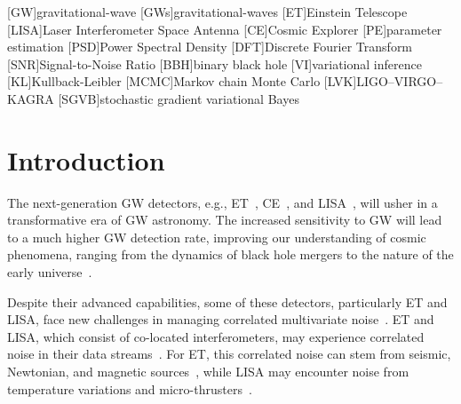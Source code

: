 \documentclass[%
 reprint,
 amsmath,amssymb,
 aps,
 nofootinbib,
]{revtex4-2}
\begin{document}
\maketitle


\begin{acronym}
    [GW]{gravitational-wave}
    [GWs]{gravitational-waves}
    [ET]{Einstein Telescope}
    [LISA]{Laser Interferometer Space Antenna}
    [CE]{Cosmic Explorer}
    [PE]{parameter estimation}
    [PSD]{Power Spectral Density}
    [DFT]{Discrete Fourier Transform}
    [SNR]{Signal-to-Noise Ratio}
    [BBH]{binary black hole}
    [VI]{variational inference}
    [KL]{Kullback-Leibler}
    [MCMC]{Markov chain Monte Carlo}
    [LVK]{LIGO--VIRGO--KAGRA}
    [SGVB]{stochastic gradient variational Bayes}
\end{acronym}


\section{Introduction}

The next-generation \ac{GW} detectors, e.g., \ac{ET}~\cite{Punturo_2010}, \ac{CE}~\cite{CE_horizon_study}, and \ac{LISA}~\cite{LISA_science_case}, will usher in a transformative era of \ac{GW} astronomy. 
The increased sensitivity to \ac{GW} will lead to a much higher \ac{GW} detection rate, improving our understanding of cosmic phenomena, ranging from the dynamics of black hole mergers to the nature of the early universe~\cite{ET_science_case, Maggiore_2020_ET_science_case, Branchesi_2023_ET_science_case, CE_horizon_study, LISA_science_case}.

Despite their advanced capabilities, some of these detectors, particularly \ac{ET} and \ac{LISA}, face new challenges in managing correlated multivariate noise~\cite{ET_design_report,LISA_red_book}.
\ac{ET} and \ac{LISA}, which consist of co-located interferometers, may experience correlated noise in their data streams~\cite{Janssens2023}. 
For \ac{ET}, this correlated noise can stem from seismic, Newtonian, and magnetic sources~\cite{Ball_lightning_strokes, Janssens_newtonian_seismic, Janssens_magnetic_noise}, while \ac{LISA}  may encounter noise from temperature variations and micro-thrusters~\cite{lisa_temp_noise,lisa_thrusters_noise,boileau2022figures}. 
\end{document}
